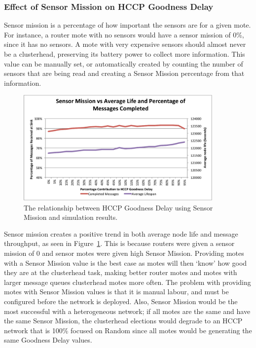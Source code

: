 \subsubsection{Effect of Sensor Mission on HCCP Goodness Delay}



Sensor mission is a percentage of how important the sensors are for a given mote. For instance,
a router mote with no sensors would have a sensor mission of 0\%, since it has no sensors. A
mote with very expensive sensors should almost never be a clusterhead, preserving its battery power
to collect more information. This value can be manually set, or automatically created by
counting the number of sensors that are being read and creating a Sensor Mission percentage from that
information.

\begin{figure}[tbhp]
	\centering
		\includegraphics[width=0.9\textwidth]{images/simulation/goodness/Sensor2.pdf}
	\caption{The relationship between HCCP Goodness Delay using Sensor Mission and simulation results.}
	\label{fig:images_simulation_goodness_Sensor}
\end{figure}

Sensor mission creates a positive trend in both average node life and message throughput, as seen in 
Figure~\ref{fig:images_simulation_goodness_Sensor}. This
is because routers were given a sensor mission of 0 and sensor motes were given high Sensor Mission.
Providing motes with a Sensor Mission value is the best case as motes will then `know' how good
they are at the clusterhead task, making better router motes and motes with larger message queues
clusterhead motes more often. The problem with providing motes with Sensor Mission values is that
it is manual labour, and must be configured before the network is deployed. Also, Sensor Mission would 
be the most successful with a heterogeneous network; if all motes are the same and have the same Sensor
Mission, the clusterhead elections would degrade to an HCCP network that is 100\% focused on Random since all
motes would be generating the same Goodness Delay values.

